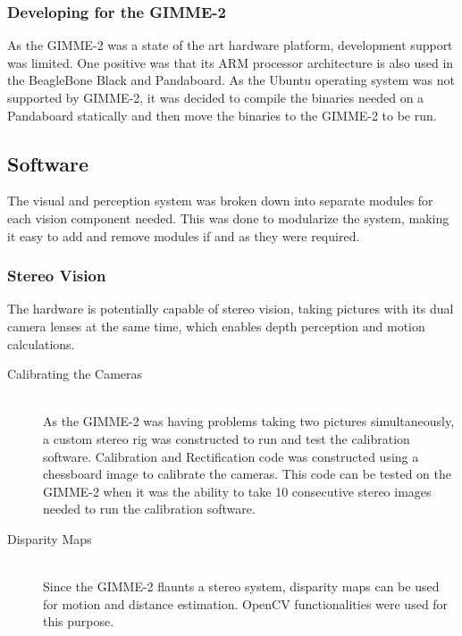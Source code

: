 \subsubsection{Developing for the GIMME-2}
As the GIMME-2 was a state of the art hardware platform, development support was limited. One positive was that its ARM processor architecture is also used in the BeagleBone Black and Pandaboard. As the Ubuntu operating system was not supported by GIMME-2, it was decided to compile the binaries needed on a Pandaboard statically and then move the binaries to the GIMME-2 to be run.

\subsection{Software}
The visual and perception system was broken down into separate modules for each vision component needed. This was done to modularize the system, making it easy to add and remove modules if and as they were required.  
\subsubsection{Stereo Vision}
The hardware is potentially capable of stereo vision, taking pictures with its dual camera lenses at the same time, which enables depth perception and motion calculations.

\begin{description}
  \item [Calibrating the Cameras] \hfill \\As the GIMME-2 was having problems taking two pictures simultaneously, a custom stereo rig was constructed to run and test the calibration software. Calibration and Rectification code was constructed using a chessboard image to calibrate the cameras. This code can be tested on the GIMME-2 when it was the ability to take 10 consecutive stereo images needed to run the calibration software.
  \item [Disparity Maps] \hfill \\Since the GIMME-2 flaunts a stereo system, disparity maps can be used for motion and distance estimation. OpenCV functionalities were used for this purpose.

\end{description}

